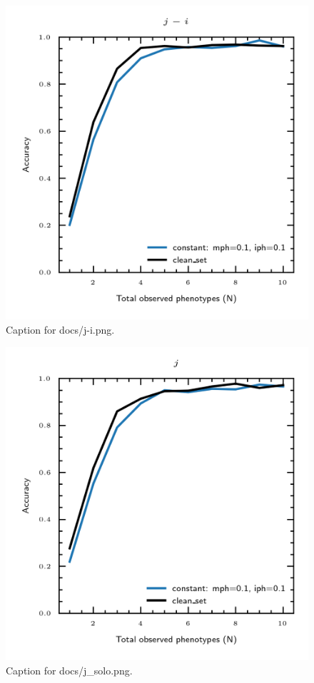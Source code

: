 \documentclass{article}
\begin{document}
\begin{figure}[h] \centering \includegraphics{docs/j-i.png} \caption{Caption for docs/j-i.png.} \end{figure}
\begin{figure}[h] \centering \includegraphics{docs/j_solo.png} \caption{Caption for docs/j_solo.png.} \end{figure}
\end{document}
